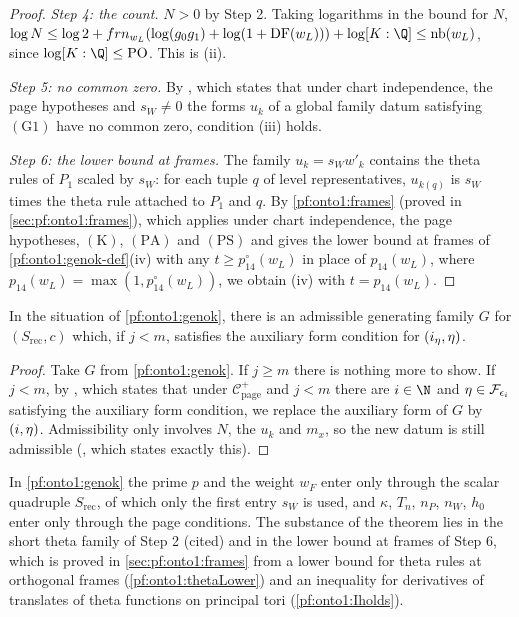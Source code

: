 \begin{proof}
\emph{Step 4: the count.} $N>0$ by Step 2. Taking logarithms in the bound for $N$,
$\log N\le\log2+frn_{w_L}(\log(g_0g_1)+\log(1+\ontooneDF(w_L)))+\log[K:\Q]\le\mathrm{nb}(w_L)$, since $\log[K:\Q]\le\mathrm{PO}$.
This is (ii).

\emph{Step 5: no common zero.} By , which states
that under chart independence, the page hypotheses and $s_W\ne0$ the forms $u_k$ of a global family datum satisfying
$(\mathrm G1)$ have no common zero, condition (iii) holds.

\emph{Step 6: the lower bound at frames.} The family $u_k=s_Ww'_k$ contains the theta rules of $P_1$ scaled by $s_W$:
for each tuple $q$ of level representatives, $u_{k(q)}$ is $s_W$ times the theta rule attached to $P_1$ and $q$. By
\cref{pf:onto1:frames} (proved in \cref{sec:pf:onto1:frames}), which applies under chart independence, the page hypotheses,
$(\mathrm K)$, $(\mathrm{PA})$ and $(\mathrm{PS})$ and gives the lower bound at frames of \cref{pf:onto1:genok-def}(iv) with any
$t\ge p_{14}^\circ(w_L)$ in place of $p_{14}(w_L)$, where $p_{14}(w_L)=\max(1,p^\circ_{14}(w_L))$, we obtain (iv) with $t=p_{14}(w_L)$.
\end{proof}

\begin{lemma}\label{pf:onto1:exists_gen_eta}
In the situation of \cref{pf:onto1:genok}, there is an admissible generating family $G$ for $(S_{\mathrm{rec}},c)$ which, if
$j<m$, satisfies the auxiliary form condition for $(i_\eta,\eta)$.
\end{lemma}

\begin{proof}
Take $G$ from \cref{pf:onto1:genok}. If $j\ge m$ there is nothing more to show. If $j<m$, by
, which states that under $\mathcal C^+_{\mathrm{page}}$ and $j<m$ there are
$i\in\N$ and $\eta\in\mathcal F_{\epsilon_i}$ satisfying the auxiliary form condition, we replace the auxiliary form of
$G$ by $(i,\eta)$. Admissibility only involves $N$, the $u_k$ and $m_x$, so the new datum is still admissible
(, which states exactly this).
\end{proof}

\begin{remark}\label{pf:onto1:rem-genok}
In \cref{pf:onto1:genok} the prime $p$ and the weight $w_F$ enter only through the scalar quadruple $S_{\mathrm{rec}}$, of
which only the first entry $s_W$ is used, and $\kappa$, $T_n$, $n_P$, $n_W$, $h_0$ enter only through the page conditions.
The substance of the theorem lies in the short theta family of Step 2 (cited) and in the lower bound at frames of Step 6,
which is proved in \cref{sec:pf:onto1:frames} from a lower bound for theta rules at orthogonal frames
(\cref{pf:onto1:thetaLower}) and an inequality for derivatives of translates of theta functions on principal tori
(\cref{pf:onto1:Iholds}).
\end{remark}

